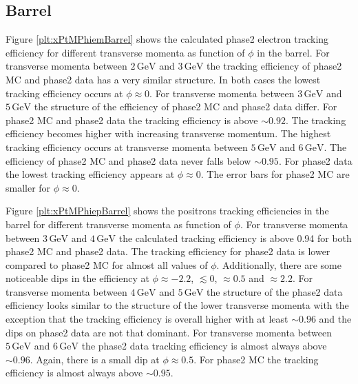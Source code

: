 \documentclass[a4paper,11pt,twosided,final,german,openbib,pdftex,listof=totoc,bibliography=totoc]{scrbook}
\begin{document}
\newpage

\subsection{Barrel}

Figure \ref{plt:xPtMPhiemBarrel} shows the calculated phase2 electron tracking efficiency for different transverse momenta as function of $\phi$ in the barrel. For transverse momenta between $2\,\textrm{GeV}$ and $3\,\textrm{GeV}$ the tracking efficiency of phase2 MC and phase2 data has a very similar structure. In both cases the lowest tracking efficiency occurs at $\phi \approx 0$. 
For transverse momenta between $3\,\textrm{GeV}$ and $5\,\textrm{GeV}$ the structure of the efficiency of phase2 MC and phase2 data differ. For phase2 MC and phase2 data the tracking efficiency is above $\sim 0.92$. The tracking efficiency becomes higher with increasing transverse momentum. The highest tracking efficiency occurs at transverse momenta between $5\,\textrm{GeV}$ and $6\,\textrm{GeV}$. The efficiency of phase2 MC and phase2 data never falls below $\sim 0.95$. 
For phase2 data the lowest tracking efficiency appears at $\phi \approx 0$. The error bars for phase2 MC are smaller for $\phi \approx 0$.


Figure \ref{plt:xPtMPhiepBarrel} shows the positrons tracking efficiencies in the barrel for different transverse momenta as function of $\phi$. 
For transverse momenta between $3\,\textrm{GeV}$ and $4\,\textrm{GeV}$ the calculated tracking efficiency is above 0.94 for both phase2 MC and phase2 data. The tracking efficiency for phase2 data is lower compared to phase2 MC for almost all values of $\phi$. Additionally, there are some noticeable dips in the efficiency at $\phi \approx -2.2$, $ \lesssim 0$, $ \approx 0.5$ and $ \approx 2.2$. 
For transverse momenta between $4\,\textrm{GeV}$ and $5\,\textrm{GeV}$ the structure of the phase2 data efficiency looks similar to the structure of the lower transverse momenta with the exception that the tracking efficiency is overall higher with at least $\sim 0.96$ and the dips on phase2 data are not that dominant. 
For transverse momenta between $5\,\textrm{GeV}$ and $6\,\textrm{GeV}$ the phase2 data tracking efficiency is almost always above $\sim 0.96$. Again, there is a small dip at $\phi \approx 0.5$. For phase2 MC the tracking efficiency is almost always above $\sim 0.95$. 
\end{document}
